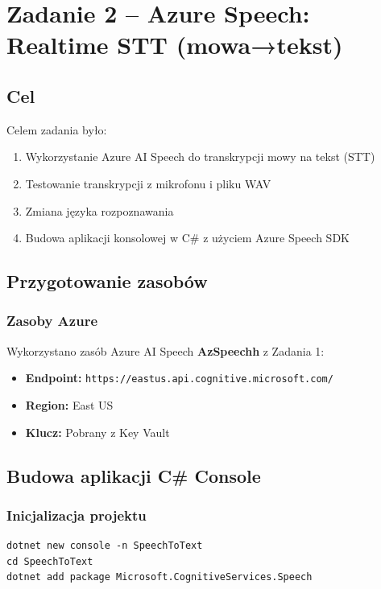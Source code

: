 \section{Zadanie 2 – Azure Speech: Realtime STT (mowa→tekst)}

\subsection{Cel}
Celem zadania było:
\begin{enumerate}
	\item Wykorzystanie Azure AI Speech do transkrypcji mowy na tekst (STT)
	\item Testowanie transkrypcji z mikrofonu i pliku WAV
	\item Zmiana języka rozpoznawania
	\item Budowa aplikacji konsolowej w C# z użyciem Azure Speech SDK
\end{enumerate}

\subsection{Przygotowanie zasobów}

\subsubsection{Zasoby Azure}
Wykorzystano zasób Azure AI Speech \textbf{AzSpeechh} z Zadania 1:
\begin{itemize}
	\item \textbf{Endpoint:} \texttt{https://eastus.api.cognitive.microsoft.com/}
	\item \textbf{Region:} East US
	\item \textbf{Klucz:} Pobrany z Key Vault
\end{itemize}

\subsection{Budowa aplikacji C\# Console}

\subsubsection{Inicjalizacja projektu}

\begin{verbatim}
dotnet new console -n SpeechToText
cd SpeechToText
dotnet add package Microsoft.CognitiveServices.Speech
\end{verbatim}

